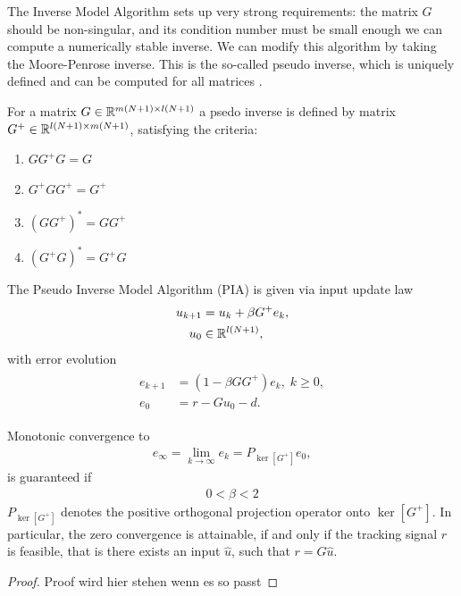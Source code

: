 The Inverse Model Algorithm sets up very strong requirements: the matrix $G$ should be non-singular, and its condition number must be small enough we can compute a numerically stable inverse. 
We can modify this algorithm by taking the Moore-Penrose inverse. This is the so-called pseudo inverse, which is uniquely defined and can be computed for all matrices \cite{LAAG}. 

\begin{defi}
	For a matrix $G \in {\mathbb{R}}^{m(N+1) \times l(N+1)}$ a psedo inverse is defined by matrix $G^+ \in {\mathbb{R}}^{l(N+1) \times m(N+1)}$, satisfying the criteria: 
	\begin{enumerate}
		\item $G G^+ G  = G $
		\item $G^+ G G^+ = G^+$
		\item $(G G^+)^* = G G^+$
		\item $(G^+ G)^* = G^+ G$
	\end{enumerate}
\end{defi}



\begin{alg}
	\label{alg:ILC:PIA}

	The Pseudo Inverse Model Algorithm (PIA) is given via input update law 
	\begin{align}
	\label{eq:ILD:errPIA}
	\begin{split}
	u_{k+1} &= u_k + \beta G^{+} e_k, \\
	u_0 & \in {\mathbb{R}}^{l (N+1)},
	\end{split}	
	\end{align}
	with error evolution
	\begin{align}
	\begin{split}
	e_{k+1} &= (1- \beta G G^+) e_{k}, \; k\geq 0, \\
	e_0 &= r -  Gu_0 -d.
	\end{split}
	\end{align}

	Monotonic convergence to 
	\begin{align}
	\label{eq:ILC:einfPIA} 
	e_\infty  = \lim_{k\to\infty} e_k = P_{\ker[G^+]}e_0,
	\end{align} 
	is guaranteed if
	\begin{align*}
	0 <\beta < 2
	\end{align*}
	$P_{\ker[G^+]}$ denotes the positive orthogonal projection operator onto $\ker[G^+]$.
	In particular, the zero convergence is attainable, if and only if the tracking signal $r$ is feasible, that is there exists an input $\hat u$, such that $r = G \hat u$. %
\end{alg}
\begin{proof}
Proof wird hier stehen wenn es so passt 
\end{proof}

